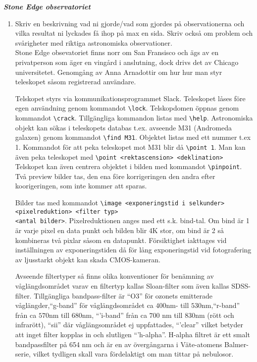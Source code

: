 \documentclass[./exercises.tex]{subfiles}
\begin{document}
\textit{\textbf{Stone Edge observatoriet  } }
\begin{enumerate}
\item Skriv en beskrivning vad ni gjorde/vad som gjordes på observationerna
 och vilka resultat ni lyckades få ihop på max en sida.
Skriv också om problem och svårigheter med riktiga astronomiska observationer. \\

Stone Edge obsevatoriet finns norr om San Fransisco och ägs av en privatperson som äger
en vingård i anslutning, dock drivs det av Chicago universitetet.
Genomgång av Anna Arnadottir om hur hur man styr teleskopet såsom registrerad användare.

Telskopet styrs via kommunikationsprogrammet Slack.
Teleskopet låses före egen användning genom kommandot \verb+\lock+. Telskopdomen öppnas genom kommandot
\verb+\crack+. Tillgängliga kommandon listas med \verb+\help+.
Astronomiska objekt kan sökas i teleskopets databas t.ex. avseende M31 (Andromeda galaxen) genom kommandot
\verb+\find M31+. Objektet listas med ett nummer t.ex 1. Kommandot för att
peka teleskopet mot M31 blir då \verb+\point 1+. Man kan även peka teleskopet med
\verb+\point <rektascension> <deklination>+
Telskopet kan även centrera objektet i bilden med kommandot \verb+\pinpoint+.
Två preview bilder tas, den ena före korrigeringen den andra efter koorigeringen,
 som inte kommer att sparas.
 
Bilder tas med kommandot
\verb+\image <exponeringstid i selkunder>+\\
\verb+<pixelreduktion> <filter typ>+\\
\verb+<antal bilder>+. Pixelreduktionen anges med ett s.k. bind-tal. Om bind är 1 är varje pixel en data punkt och bilden blir
4K stor, om bind är 2 så kombineras två pixlar såsom en datapunkt. Försiktighet iakttages vid
inställningen av exponeringstiden då för lång exponeringstid
vid fotografering av ljusstarkt objekt kan skada CMOS-kameran.

Avseende filtertyper så finns olika konventioner för benämning av
våglängdsområdet varav en filtertyp kallas Sloan-filter som även kallas
SDSS-filter. Tillgängliga bandpass-filter är ``O3'' för ozonets emitterade våglängder,``g-band''
för våglängdsområdet ca $400$nm- till $530$nm,``r-band'' från ca $570$nm till $680$nm, ``'i-band'' från
ca $700$ nm till $830$nm (rött och infrarött), ``sii'' där våglängsområdet ej uppfattades, ``'clear'' vilket
betyder att inget filter kopplas in och slutligen ``'h-alpha''. H-alpha filtret är ett smalt bandpassfilter
på 654 nm och är en av övergångarna i Väte-atomens Balmer-serie, vilket tydligen skall vara fördelaktigt om man tittar på nebulosor.


\end{enumerate}
\end{document}
